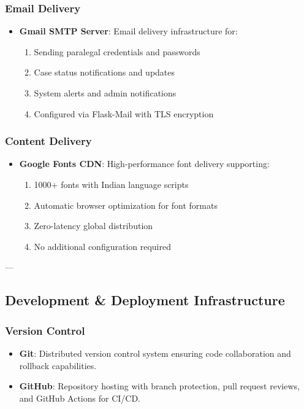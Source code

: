 \subsubsection{Email Delivery}
\begin{itemize}
    \item \textbf{Gmail SMTP Server}: Email delivery infrastructure for:
    \begin{enumerate}
        \item Sending paralegal credentials and passwords
        \item Case status notifications and updates
        \item System alerts and admin notifications
        \item Configured via Flask-Mail with TLS encryption
    \end{enumerate}
\end{itemize}

\subsubsection{Content Delivery}
\begin{itemize}
    \item \textbf{Google Fonts CDN}: High-performance font delivery supporting:
    \begin{enumerate}
        \item 1000+ fonts with Indian language scripts
        \item Automatic browser optimization for font formats
        \item Zero-latency global distribution
        \item No additional configuration required
    \end{enumerate}
\end{itemize}

---

\subsection{Development \& Deployment Infrastructure}

\subsubsection{Version Control}
\begin{itemize}
    \item \textbf{Git}: Distributed version control system ensuring code collaboration and rollback capabilities.
    \item \textbf{GitHub}: Repository hosting with branch protection, pull request reviews, and GitHub Actions for CI/CD.
\end{itemize}

